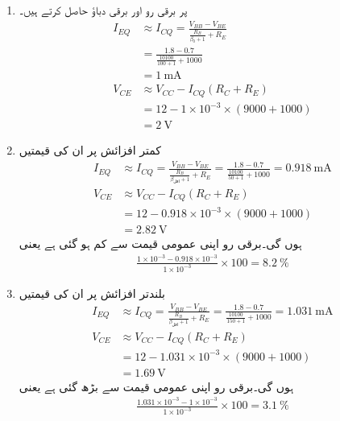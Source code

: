 \begin{enumerate}
\item
{} پر برقی رو اور برقی دباؤ حاصل کرتے ہیں۔
\begin{align*}
I_{EQ} &\approx I_{CQ} =\frac{V_{BB}-V_{BE}}{\frac{R_B}{\beta_0+1}+R_E}\\
&=\frac{1.8-0.7}{\frac{10100}{100+1}+1000}\\
&=\SI{1}{\milli \ampere}\\
V_{CE} &\approx V_{CC} -I_{CQ} \left (R_C+R_E \right ) \\
&=12-1 \times 10^{-3} \times \left (9000+1000 \right )\\
&=\SI{2}{\volt}
\end{align*}

\item
کمتر افزائش   پر ان کی قیمتیں
\begin{align*}
I_{EQ} &\approx I_{CQ} =\frac{V_{BB}-V_{BE}}{\frac{R_B}{\beta_\text{اقل}+1}+R_E}=\frac{1.8-0.7}{\frac{10100}{50+1}+1000}=\SI{0.918}{\milli \ampere}\\
V_{CE} &\approx V_{CC} -I_{CQ} \left (R_C+R_E \right ) \\
&=12-0.918 \times 10^{-3} \times \left (9000+1000 \right )\\
&=\SI{2.82}{\volt}
\end{align*}
ہوں گی۔برقی رو اپنی عمومی قیمت سے   کم ہو گئی ہے یعنی
\begin{align*}
\frac{1 \times 10^{-3} -0.918 \times 10^{-3}}{1 \times 10^{-3}} \times 100 = \SI{8.2}{\percent}
\end{align*}

\item

بلندتر افزائش   پر ان کی قیمتیں
\begin{align*}
I_{EQ} & \approx I_{CQ} =\frac{V_{BB}-V_{BE}}{\frac{R_B}{\beta_\text{اقل}+1}+R_E}=\frac{1.8-0.7}{\frac{10100}{150+1}+1000}=\SI{1.031}{\milli \ampere}\\
V_{CE} &\approx V_{CC} -I_{CQ} \left (R_C+R_E \right ) \\
&=12-1.031 \times 10^{-3} \times \left (9000+1000 \right )\\
&=\SI{1.69}{\volt} 
\end{align*}
ہوں گی۔برقی رو اپنی عمومی قیمت سے   بڑھ گئی ہے یعنی
\begin{align*}
\frac{1.031 \times 10^{-3} -1 \times 10^{-3}}{1 \times 10^{-3}} \times 100 = \SI{3.1}{\percent}
\end{align*}

\end{enumerate}

